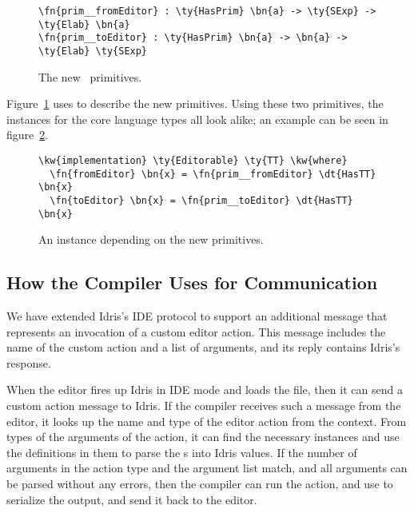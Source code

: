\begin{figure}
\begin{Verbatim}
\fn{prim__fromEditor} : \ty{HasPrim} \bn{a} -> \ty{SExp} -> \ty{Elab} \bn{a}
\fn{prim__toEditor} : \ty{HasPrim} \bn{a} -> \bn{a} -> \ty{Elab} \ty{SExp}
\end{Verbatim}
  \caption{The new \Elab\ primitives.}
\label{code:newElabPrims}
\end{figure}

Figure~\ref{code:newElabPrims} uses  to describe the new \Elab{} primitives.
Using these two primitives, the \Editorable{} instances for the core language
types all look alike; an example can be seen in figure~\ref{fig:editorablePrim}.

\begin{figure}
\begin{Verbatim}
\kw{implementation} \ty{Editorable} \ty{TT} \kw{where}
  \fn{fromEditor} \bn{x} = \fn{prim__fromEditor} \dt{HasTT} \bn{x}
  \fn{toEditor} \bn{x} = \fn{prim__toEditor} \dt{HasTT} \bn{x}
\end{Verbatim}
\caption{An \Editorable{} instance depending on the new primitives.}
\label{fig:editorablePrim}
\end{figure}

\subsection{How the Compiler Uses \Editorable{} for Communication}
\label{ssec:communication}

We have extended Idris's IDE protocol to support an additional message that
represents an invocation of a custom editor action.
This message includes the name of the custom action and a list of arguments,
and its reply contains Idris's response.

When the editor fires up Idris in IDE mode and loads the file, then it can send
a custom action message to Idris. If the compiler receives such a message from
the editor, it looks up the name and type of the editor action from the
context. From types of the arguments of the \Elab{} action, it can find the
necessary \Editorable{} instances and use the  definitions in them
to parse the \sexp{}s into Idris values. If the number of arguments in the
action type and the argument list match, and all arguments can be parsed
without any errors, then the compiler can run the \Elab{} action, and use
 to serialize the output, and send it back to the editor.

